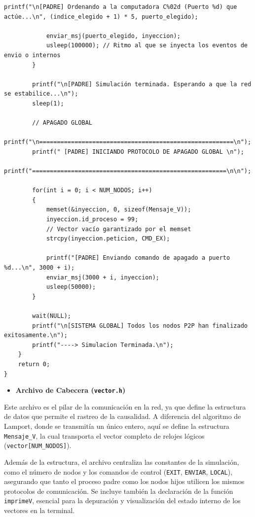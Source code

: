 \begin{lstlisting}[style=estiloC]
            printf("\n[PADRE] Ordenando a la computadora C%02d (Puerto %d) que actúe...\n", (indice_elegido + 1) * 5, puerto_elegido);
                   
            enviar_msj(puerto_elegido, inyeccion);
            usleep(100000); // Ritmo al que se inyecta los eventos de envio o internos
        }

        printf("\n[PADRE] Simulación terminada. Esperando a que la red se estabilice...\n");
        sleep(1); 

        // APAGADO GLOBAL
        printf("\n=======================================================\n");
        printf(" [PADRE] INICIANDO PROTOCOLO DE APAGADO GLOBAL \n");
        printf("=======================================================\n\n");

        for(int i = 0; i < NUM_NODOS; i++) 
        {
            memset(&inyeccion, 0, sizeof(Mensaje_V));
            inyeccion.id_proceso = 99; 
            // Vector vacío garantizado por el memset
            strcpy(inyeccion.peticion, CMD_EX); 
            
            printf("[PADRE] Enviando comando de apagado a puerto %d...\n", 3000 + i);
            enviar_msj(3000 + i, inyeccion);
            usleep(50000); 
        }

        wait(NULL); 
        printf("\n[SISTEMA GLOBAL] Todos los nodos P2P han finalizado exitosamente.\n");
        printf("----> Simulacion Terminada.\n");
    }
    return 0;
}
\end{lstlisting}

\begin{itemize}
    \item \textbf{Archivo de Cabecera (\texttt{vector.h})}
\end{itemize}

Este archivo es el pilar de la comunicación en la red, ya que define la estructura de datos que permite el rastreo de la causalidad. A diferencia del algoritmo de Lamport, donde se transmitía un único entero, aquí se define la estructura \texttt{Mensaje\_V}, la cual transporta el vector completo de relojes lógicos (\texttt{vector[NUM\_NODOS]}). 

Además de la estructura, el archivo centraliza las constantes de la simulación, como el número de nodos y los comandos de control (\texttt{EXIT}, \texttt{ENVIAR}, \texttt{LOCAL}), asegurando que tanto el proceso padre como los nodos hijos utilicen los mismos protocolos de comunicación. Se incluye también la declaración de la función \texttt{imprimeV}, esencial para la depuración y visualización del estado interno de los vectores en la terminal.

